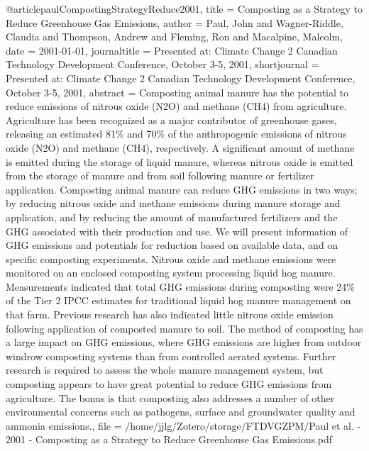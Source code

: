 {{{{@article{paulCompostingStrategyReduce2001,
  title = {Composting as a {{Strategy}} to {{Reduce Greenhouse Gas Emissions}}},
  author = {Paul, John and Wagner-Riddle, Claudia and Thompson, Andrew and Fleming, Ron and Macalpine, Malcolm},
  date = {2001-01-01},
  journaltitle = {Presented at: Climate Change 2 Canadian Technology Development Conference, October 3-5, 2001},
  shortjournal = {Presented at: Climate Change 2 Canadian Technology Development Conference, October 3-5, 2001},
  abstract = {Composting animal manure has the potential to reduce emissions of nitrous oxide (N2O) and methane (CH4) from agriculture. Agriculture has been recognized as a major contributor of greenhouse gases, releasing an estimated 81\% and 70\% of the anthropogenic emissions of nitrous oxide (N2O) and methane (CH4), respectively. A significant amount of methane is emitted during the storage of liquid manure, whereas nitrous oxide is emitted from the storage of manure and from soil following manure or fertilizer application. Composting animal manure can reduce GHG emissions in two ways; by reducing nitrous oxide and methane emissions during manure storage and application, and by reducing the amount of manufactured fertilizers and the GHG associated with their production and use. We will present information of GHG emissions and potentials for reduction based on available data, and on specific composting experiments. Nitrous oxide and methane emissions were monitored on an enclosed composting system processing liquid hog manure. Measurements indicated that total GHG emissions during composting were 24\% of the Tier 2 IPCC estimates for traditional liquid hog manure management on that farm. Previous research has also indicated little nitrous oxide emission following application of composted manure to soil. The method of composting has a large impact on GHG emissions, where GHG emissions are higher from outdoor windrow composting systems than from controlled aerated systems. Further research is required to assess the whole manure management system, but composting appears to have great potential to reduce GHG emissions from agriculture. The bonus is that composting also addresses a number of other environmental concerns such as pathogens, surface and groundwater quality and ammonia emissions.},
  file = {/home/jjlg/Zotero/storage/FTDVGZPM/Paul et al. - 2001 - Composting as a Strategy to Reduce Greenhouse Gas Emissions.pdf}
}

}}}}
